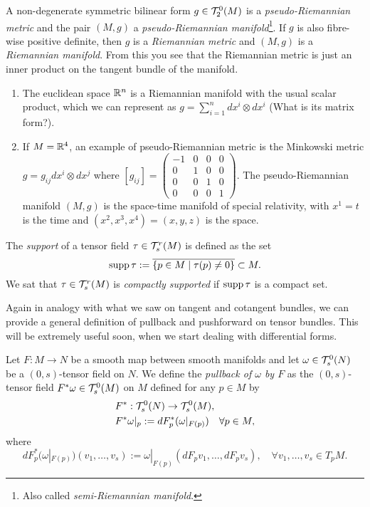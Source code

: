 \begin{example}
  A non-degenerate symmetric bilinear form $g\in \mathcal{T}_2^0(M)$ is a \emph{pseudo-Riemannian metric} and the pair $(M,g)$ a \emph{pseudo-Riemannian manifold}\footnote{Also called \emph{semi-Riemannian manifold}.}.
  If $g$ is also fibre-wise positive definite, then $g$ is a \emph{Riemannian metric} and $(M,g)$ is a \emph{Riemannian manifold}.
  From this you see that the Riemannian metric is just an inner product on the tangent bundle of the manifold.

  \begin{enumerate}
    \item The euclidean space $\mathbb{R}^n$ is a Riemannian manifold with the usual scalar product, which we can represent as $g = \sum_{i=1}^n dx^i\otimes dx^i$ (What is its matrix form?).
    \item If $M=\mathbb{R}^4$, an example of pseudo-Riemannian metric is the Minkowski metric $g = g_{ij} dx^i\otimes dx^j$ where $[g_{ij}] = {\left(\begin{smallmatrix} -1 & 0 & 0 & 0\\ 0 & 1 & 0 & 0 \\ 0 & 0 & 1 & 0 \\ 0 & 0 & 0 & 1 \end{smallmatrix}\right)}$. The pseudo-Riemannian manifold $(M, g)$ is the space-time manifold of special relativity, with $x^1 = t$ is the time and $(x^2, x^3, x^4) = (x,y,z)$ is the space.
  \end{enumerate}
\end{example}

\begin{definition}
  The \emph{support} of a tensor field $\tau\in\mathcal{T}_s^r(M)$ is defined as the set
  \begin{equation}
    \operatorname{supp} \tau := \overline{\{p\in M\mid \tau(p) \neq 0\}} \subset M.
  \end{equation}
  We sat that $\tau\in\mathcal{T}_s^r(M)$ is \emph{compactly supported} if $\operatorname{supp}\tau$ is a compact set.
\end{definition}

Again in analogy with what we saw on tangent and cotangent bundles, we can provide a general definition of pullback and pushforward on tensor bundles.
This will be extremely useful soon, when we start dealing with differential forms.

\begin{definition}\label{def:pullback0s}
  Let $F:M\to N$ be a smooth map between smooth manifolds and let $\omega \in \mathcal{T}_s^0(N)$ be a $(0,s)$-tensor field on $N$. We define the \emph{pullback of $\omega$ by $F$} as the $(0,s)$-tensor field $F^*\omega \in \mathcal{T}_s^0(M)$ on $M$ defined for any $p\in M$ by
  \begin{align}
    &F^* : \mathcal{T}_s^0(N) \to \mathcal{T}_s^0(M),\\
    &F^*\omega|_p := dF^*_p(\omega|_{F(p)}) \quad \forall p\in M,
  \end{align}
  where
  \begin{equation}
    dF^*_p(\omega|_{F(p)})(v_1, \ldots, v_s) := \omega|_{F(p)} (dF_p v_1, \ldots, dF_p v_s), \quad\forall v_1, \ldots, v_s \in T_p M.
  \end{equation}
\end{definition}


